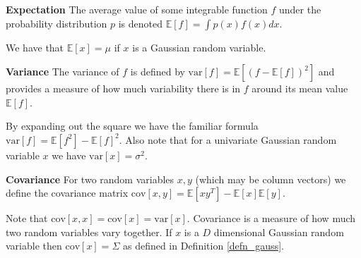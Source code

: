 \begin{defn}
\textbf{Expectation} The average value of some integrable function $f$ under the probability distribution $p$ is denoted $\mathbb{E}[f] = \int p(x)f(x)dx$.
\label{def_expectation}
\end{defn}
We have that $\mathbb{E}[x]=\mu$ if $x$ is a Gaussian random variable.
\begin{defn}
\textbf{Variance} The variance of $f$ is defined by $\text{var}[f] = \mathbb{E}[(f - \mathbb{E}[f])^2]$ and provides a measure of how much variability there is in $f$ around its mean value $\mathbb{E}[f]$.
\label{def_variance}
\end{defn}
By expanding out the square we have the familiar formula $\text{var}[f] = \mathbb{E}[f^2] - \mathbb{E}[f]^2$. Also note that for a  univariate Gaussian random variable $x$ we have $\text{var}[x] =\sigma^2$.
\begin{defn}
\textbf{Covariance} For two random variables $x,y$ (which may be column vectors) we define the covariance matrix $\text{cov}[x,y] = \mathbb{E}[xy^T] - \mathbb{E}[x]\mathbb{E}[y]$.
\label{def_covariance}
\end{defn}
Note that $\text{cov}[x,x]=\text{cov}[x]=\text{var}[x]$. Covariance is a measure of how much two random variables vary together. If $x$ is a $D$ dimensional Gaussian random variable then $\text{cov}[x] = \Sigma$ as defined in Definition \ref{defn_gauss}.

